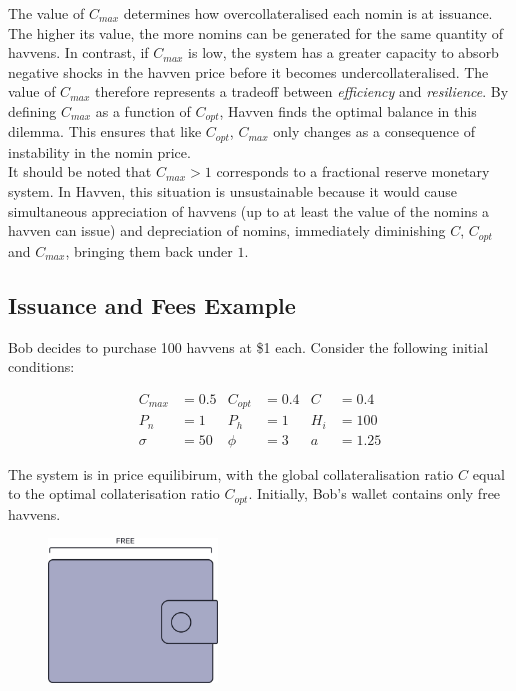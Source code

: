\noindent The value of $C_{max}$ determines how overcollateralised each nomin is at issuance. The higher its value, the more nomins can be generated for the same quantity of havvens. In contrast, if $C_{max}$ is low, the system has a greater capacity to absorb negative shocks in the havven price before it becomes undercollateralised.  The value of $C_{max}$ therefore represents a tradeoff between \textit{efficiency} and \textit{resilience}. By defining $C_{max}$ as a function of $C_{opt}$, Havven finds the optimal balance in this dilemma. This ensures that like $C_{opt}$, $C_{max}$ only changes as a consequence of instability in the nomin price. \\

\noindent It should be noted that $C_{max} > 1$ corresponds to a fractional reserve monetary system. In Havven, this situation is unsustainable because it would cause simultaneous appreciation of havvens (up to at least the value of the nomins a havven can issue) and depreciation of nomins, immediately diminishing $C$, $C_{opt}$ and $C_{max}$, bringing them back under $1$.

\subsection{Issuance and Fees Example} 

\noindent Bob decides to purchase 100 havvens at \$1 each. Consider the following initial conditions:

\begin{align*}
C_{max} &= 0.5 & C_{opt} &= 0.4 & C &= 0.4 \\
P_n &= 1 & P_h &= 1 & H_i &= 100 \\
\sigma &= 50 & \phi &= 3 & a&= 1.25
\end{align*}

\noindent The system is in price equilibirum, with the global collateralisation ratio $C$ equal to the optimal collaterisation ratio $C_{opt}$. Initially,  Bob's wallet contains only free havvens.

\begin{figure}[h!]
\centering
    \includegraphics[width=0.40\textwidth]{img/wallet}
\end{figure}

